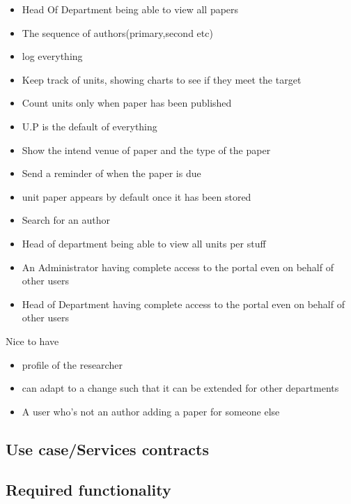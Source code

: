 \documentclass[a4paper,12pt]{article}
\begin{document}
\begin{itemize}
\item Head Of Department being able to view all papers
\item The sequence of authors(primary,second etc)
\item log everything 
\item Keep track of units, showing charts to see if they meet the target
\item Count units only when paper has been published
\item U.P is the default of everything
\item Show the intend venue of paper and the type of the paper
\item Send a reminder of when the paper is due
\item unit paper appears by default once it has been stored
\item Search for an author
\item Head of department being able to view all units per stuff
\item An Administrator having complete access to the portal even on behalf of other users
\item Head of Department having complete access to the portal even on behalf of other users
\end{itemize}
Nice to have
\begin{itemize}
 \item profile of the researcher
 \item can adapt to a change such that it can be extended for other departments
 \item A user who's not an author adding a paper for someone else
\end{itemize}

\subsection{Use case/Services contracts}

\subsection{Required functionality}
\end{document}
